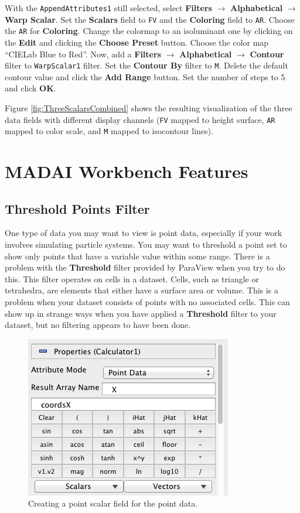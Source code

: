 \documentclass[12pt]{article}
\newcommand{\filter}[1]{\textbf{#1}}
\newcommand{\filterinstance}[1]{\texttt{#1}}
\newcommand{\menu}[1]{\textbf{#1}}
\newcommand{\setting}[1]{\textbf{#1}}
\newcommand{\field}[1]{\texttt{#1}}
\begin{document}
With the \filterinstance{AppendAttributes1} still selected, select \filter{Filters} $\rightarrow$ \filter{Alphabetical} $\rightarrow$ \filter{Warp Scalar}. Set the \setting{Scalars} field to \field{FV} and the \setting{Coloring} field to \field{AR}. Choose the \field{AR} for \setting{Coloring}. Change the colormap to an isoluminant one by clicking on the \setting{Edit} and clicking the \setting{Choose Preset} button. Choose the color map ``CIELab Blue to Red''.  Now, add a \menu{Filters} $\rightarrow$ \menu{Alphabetical} $\rightarrow$ \menu{Contour} filter to \filterinstance{WarpScalar1} filter. Set the \setting{Contour By} filter to \field{M}. Delete the default contour value and click the \setting{Add Range} button. Set the number of steps to 5 and click \setting{OK}.

Figure \ref{fig:ThreeScalarsCombined} shows the resulting visualization of the three data fields with different display channels (\field{FV} mapped to height surface, \field{AR} mapped to color scale, and \field{M} mapped to isocontour lines).

\section{MADAI Workbench Features}

\subsection{Threshold Points Filter}

One type of data you may want to view is point data, especially if your work involves simulating particle systems. You may want to threshold a point set to show only points that have a variable value within some range. There is a problem with the \filter{Threshold} filter provided by ParaView when you try to do this. This filter operates on cells in a dataset. Cells, such as triangle or tetrahedra, are elements that either have a surface area or volume. This is a problem when your dataset consists of points with no associated cells. This can show up in strange ways when you have applied a \filter{Threshold} filter to your dataset, but no filtering appears to have been done.

\begin{figure}[htbp]
   \centering
   \includegraphics[scale=.5]{images/ThresholdPointsFilterCalculator.png} %
   \caption{Creating a point scalar field for the point data.}
   \label{fig:ThresholdPointsFilterCalculator}
\end{figure}
\end{document}

